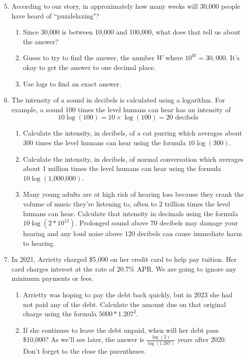 \begin{enumerate} 
\setcounter{enumi}{4}

\item According to our story, in approximately how many weeks will 30,000 people have heard of ``puzzlelaxing"?
\begin{enumerate}
\item Since 30,000 is between 10,000 and 100,000, what does that tell us about the answer?
\item Guess to try to find the answer, the number $W$ where $10^W = 30,000$.  It's okay to get the answer to one decimal place.
\item Use logs to find an exact answer.
\end{enumerate}

\item The intensity of a sound in decibels is calculated using a logarithm.  For example, a sound 100 times the level humans can hear has an intensity of 
$$10\log (100)= 10 \times \log(100)= 20\text{ decibels}$$
\begin{enumerate}
\item Calculate the intensity, in decibels, of a cat purring which averages about 300 times the level humans can hear using the formula $10\log(\text{300})$.
\item Calculate the intensity, in decibels, of normal conversation which averages about 1 million times the level humans can hear using the formula $10\log(\text{1,000,000})$.
\item Many young adults are at high risk of hearing loss because they crank the volume of music they're listening to, often to 2 trillion times the level humans can hear.  Calculate that intensity in decimals using the formula $10\log(2 \ast10^{12})$. Prolonged sound above 70 decibels may damage your hearing and any loud noise above 120 decibels can cause immediate harm to hearing.
\end{enumerate}

\item In 2021, Arrietty charged \$5,000 on her credit card to help pay tuition.  Her card charges interest at the rate of 20.7\% APR.   We are going to ignore any minimum payments or fees.
\begin{enumerate}
\item Arrietty was hoping to pay the debt back quickly, but in 2023 she had not paid any of the debt.  Calculate the amount due on that original charge using the formula $5000 \ast 1.207^2$.
\item If she continues to leave the debt unpaid, when will her debt pass \$10,000? As we'll see later, the answer is $\displaystyle \frac{\log(2)}{\log(1.207)}$ years after 2020.  Don't forget to the close the parentheses.  
\end{enumerate}


\end{enumerate}
